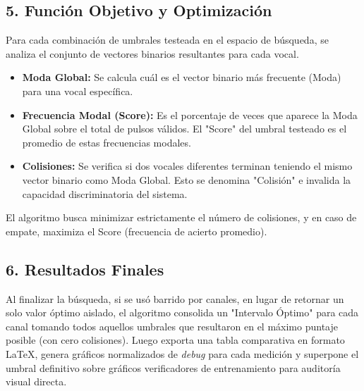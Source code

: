 \documentclass[12pt, a4paper]{article}
\begin{document}
\subsection{5. Función Objetivo y Optimización}
Para cada combinación de umbrales testeada en el espacio de búsqueda, se analiza el conjunto de vectores binarios resultantes para cada vocal. 
\begin{itemize}
    \item \textbf{Moda Global:} Se calcula cuál es el vector binario más frecuente (Moda) para una vocal específica.
    \item \textbf{Frecuencia Modal (Score):} Es el porcentaje de veces que aparece la Moda Global sobre el total de pulsos válidos. El "Score" del umbral testeado es el promedio de estas frecuencias modales.
    \item \textbf{Colisiones:} Se verifica si dos vocales diferentes terminan teniendo el mismo vector binario como Moda Global. Esto se denomina "Colisión" e invalida la capacidad discriminatoria del sistema.
\end{itemize}
El algoritmo busca minimizar estrictamente el número de colisiones, y en caso de empate, maximiza el Score (frecuencia de acierto promedio). 

\subsection{6. Resultados Finales}
Al finalizar la búsqueda, si se usó barrido por canales, en lugar de retornar un solo valor óptimo aislado, el algoritmo consolida un "Intervalo Óptimo" para cada canal tomando todos aquellos umbrales que resultaron en el máximo puntaje posible (con cero colisiones). Luego exporta una tabla comparativa en formato \LaTeX, genera gráficos normalizados de \textit{debug} para cada medición y superpone el umbral definitivo sobre gráficos verificadores de entrenamiento para auditoría visual directa.
\end{document}
